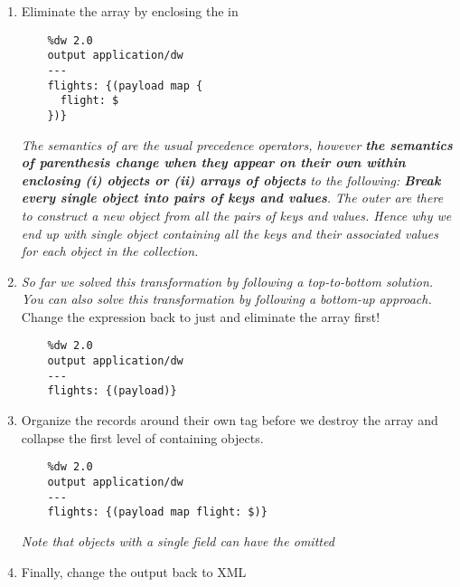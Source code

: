 \begin{enumerate}[resume*]
\item Eliminate the array by enclosing the  in \ttt{$\{()\}$}
  \begin{verbatim}
    %dw 2.0
    output application/dw
    ---
    flights: {(payload map {
      flight: $
    })}
  \end{verbatim}
  \emph{
    The semantics of \ttt{()} are the usual precedence operators, however \textbf{the semantics of parenthesis change when they appear on their own within \ttt{$\{\}$} enclosing (i) objects or (ii) arrays of objects} to the following: \textbf{Break every single object into pairs of keys and values}. The outer \ttt{$\{\}$} are there to construct a new object from all the pairs of keys and values. Hence why we end up with single object containing all the keys and their associated values for each object in the collection.
  }
\item \emph{So far we solved this transformation by following a top-to-bottom solution.  You can also solve this transformation by following a bottom-up approach.}
  \newline
  Change the expression back to just  and eliminate the array first!
  \begin{verbatim}
    %dw 2.0
    output application/dw
    ---
    flights: {(payload)}
  \end{verbatim}
\item Organize the records around their own tag before we destroy the array and collapse the first level of containing objects.
  \begin{verbatim}
    %dw 2.0
    output application/dw
    ---
    flights: {(payload map flight: $)}
  \end{verbatim}
  \emph{Note that objects with a single field can have the \ttt{$\{\}$} omitted}
\item Finally, change the output back to XML
  
\end{enumerate}

